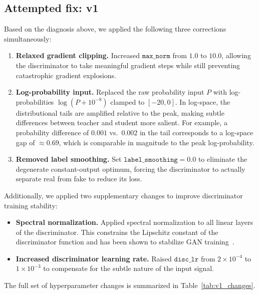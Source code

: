 \documentclass{article}
\begin{document}
\subsection{Attempted fix: v1}

Based on the diagnosis above, we applied the following three corrections simultaneously:

\begin{enumerate}
    \item \textbf{Relaxed gradient clipping.} Increased $\texttt{max\_norm}$ from $1.0$ to $10.0$, allowing the discriminator to take meaningful gradient steps while still preventing catastrophic gradient explosions.
    \item \textbf{Log-probability input.} Replaced the raw probability input $P$ with log-probabilities $\log(P + 10^{-8})$ clamped to $[-20, 0]$. In log-space, the distributional tails are amplified relative to the peak, making subtle differences between teacher and student more salient. For example, a probability difference of $0.001$ vs.\ $0.002$ in the tail corresponds to a log-space gap of $\approx 0.69$, which is comparable in magnitude to the peak log-probability.
    \item \textbf{Removed label smoothing.} Set $\texttt{label\_smoothing} = 0.0$ to eliminate the degenerate constant-output optimum, forcing the discriminator to actually separate real from fake to reduce its loss.
\end{enumerate}

Additionally, we applied two supplementary changes to improve discriminator training stability:
\begin{itemize}
    \item \textbf{Spectral normalization.} Applied spectral normalization to all linear layers of the discriminator. This constrains the Lipschitz constant of the discriminator function and has been shown to stabilize GAN training~\cite{miyato2018spectral}.
    \item \textbf{Increased discriminator learning rate.} Raised $\texttt{disc\_lr}$ from $2 \times 10^{-4}$ to $1 \times 10^{-3}$ to compensate for the subtle nature of the input signal.
\end{itemize}

The full set of hyperparameter changes is summarized in Table~\ref{tab:v1_changes}.
\end{document}
